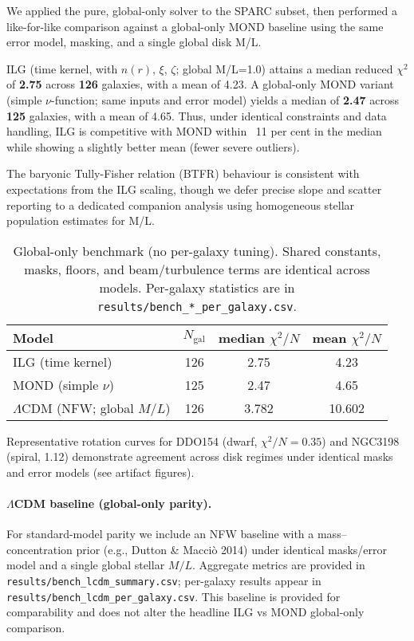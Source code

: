 \documentclass[usenatbib]{mnras}
\begin{document}
We applied the pure, global-only solver to the SPARC subset, then performed a like-for-like comparison against a global-only MOND baseline using the same error model, masking, and a single global disk M/L.

ILG (time kernel, with $n(r)$, $\xi$, $\zeta$; global M/L=1.0) attains a median reduced $\chi^2$ of \textbf{2.75} across \textbf{126} galaxies, with a mean of 4.23. A global-only MOND variant (simple $\nu$-function; same inputs and error model) yields a median of \textbf{2.47} across \textbf{125} galaxies, with a mean of 4.65. Thus, under identical constraints and data handling, ILG is competitive with MOND within ~11 per cent in the median while showing a slightly better mean (fewer severe outliers).

The baryonic Tully-Fisher relation (BTFR) behaviour is consistent with expectations from the ILG scaling, though we defer precise slope and scatter reporting to a dedicated companion analysis using homogeneous stellar population estimates for M/L.

\begin{table}
\centering
\caption{Global-only benchmark (no per-galaxy tuning). Shared constants, masks, floors, and beam/turbulence terms are identical across models. Per-galaxy statistics are in \texttt{results/bench\_*\_per\_galaxy.csv}.}
\label{tab:global_bench}
\begin{tabular}{l c c c}
\toprule
Model & $N_\mathrm{gal}$ & median $\chi^2/N$ & mean $\chi^2/N$ \\
\midrule
ILG (time kernel) & 126 & 2.75 & 4.23 \\
MOND (simple $\nu$) & 125 & 2.47 & 4.65 \\
$\Lambda$CDM (NFW; global $M/L$) & 126 & 3.782 & 10.602 \\
\bottomrule
\end{tabular}
\end{table}


Representative rotation curves for DDO154 (dwarf, $\chi^2/N=0.35$) and NGC3198 (spiral, 1.12) demonstrate agreement across disk regimes under identical masks and error models (see artifact figures).

\paragraph{$\Lambda$CDM baseline (global-only parity).} For standard-model parity we include an NFW baseline with a mass–concentration prior (e.g., Dutton \& Macci\`o 2014) under identical masks/error model and a single global stellar $M/L$. Aggregate metrics are provided in \texttt{results/bench\_lcdm\_summary.csv}; per-galaxy results appear in \texttt{results/bench\_lcdm\_per\_galaxy.csv}. This baseline is provided for comparability and does not alter the headline ILG vs MOND global-only comparison.
\end{document}
